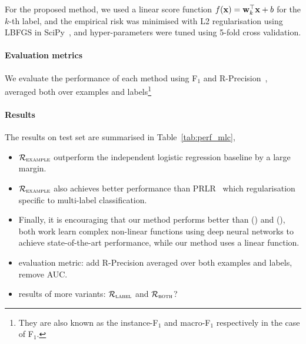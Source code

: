 For the proposed method, we used a linear score function $f(\mathbf{x}) = \mathbf{w}_k^\top \mathbf{x} + b$ for the $k$-th label,
and the empirical risk was minimised with L2 regularisation using LBFGS in SciPy~\cite{scipy,lbfgsb},
and hyper-parameters were tuned using 5-fold cross validation.

\paragraph{Evaluation metrics}
We evaluate the performance of each method using F$_1$ and R-Precision~\cite{manning2008introIR},
averaged both over examples and labels\footnote{They are also known as the instance-F$_1$ and macro-F$_1$ respectively in the case of F$_1$.}


\paragraph{Results}
The results on test set are summarised in Table~\ref{tab:perf_mlc},
\begin{itemize}
\item $\mathcal{R}_\textsc{example}$ outperform the independent logistic regression baseline by a large margin.
\item $\mathcal{R}_\textsc{example}$ also achieves better performance than PRLR~\cite{lin2014multi} which regularisation specific to multi-label classification.
\item Finally, it is encouraging that our method performs better than (\cite{belanger2016structured}) and (\cite{gygli2017deep}),
both work learn complex non-linear functions using deep neural networks to achieve state-of-the-art performance, while our method uses a linear function.
\end{itemize}

\TODO
\begin{itemize}
\item evaluation metric: add R-Precision averaged over both examples and labels, remove AUC.
\item results of more variants: $\mathcal{R}_\textsc{label}$ and $\mathcal{R}_\textsc{both}$?
\end{itemize}

